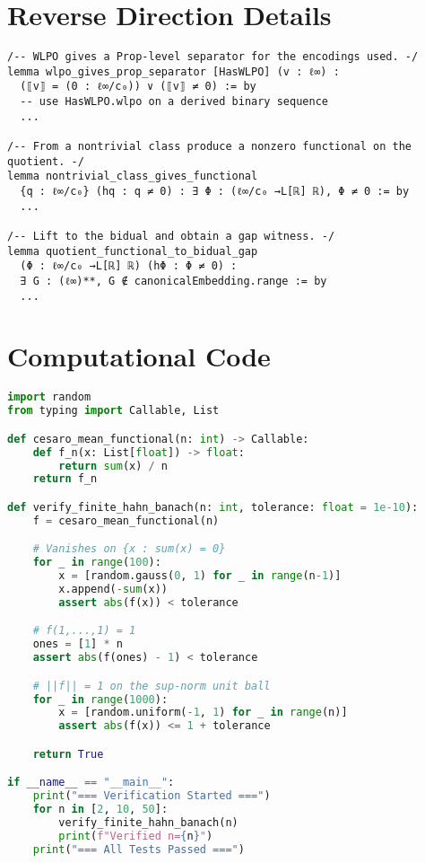 \documentclass{lmcs}
\begin{document}
\section{Reverse Direction Details}

\begin{lstlisting}[caption={Lemma structure for WLPO ⇒ Gap}]
/-- WLPO gives a Prop-level separator for the encodings used. -/
lemma wlpo_gives_prop_separator [HasWLPO] (v : ℓ∞) :
  (⟦v⟧ = (0 : ℓ∞/c₀)) ∨ (⟦v⟧ ≠ 0) := by
  -- use HasWLPO.wlpo on a derived binary sequence
  ...

/-- From a nontrivial class produce a nonzero functional on the quotient. -/
lemma nontrivial_class_gives_functional
  {q : ℓ∞/c₀} (hq : q ≠ 0) : ∃ Φ : (ℓ∞/c₀ →L[ℝ] ℝ), Φ ≠ 0 := by
  ...

/-- Lift to the bidual and obtain a gap witness. -/
lemma quotient_functional_to_bidual_gap
  (Φ : ℓ∞/c₀ →L[ℝ] ℝ) (hΦ : Φ ≠ 0) :
  ∃ G : (ℓ∞)**, G ∉ canonicalEmbedding.range := by
  ...
\end{lstlisting}

\section{Computational Code}\label{app:computational}

\begin{lstlisting}[language=Python, caption={Finite Hahn--Banach verification (Cesàro means)}]
import random
from typing import Callable, List

def cesaro_mean_functional(n: int) -> Callable:
    def f_n(x: List[float]) -> float:
        return sum(x) / n
    return f_n

def verify_finite_hahn_banach(n: int, tolerance: float = 1e-10):
    f = cesaro_mean_functional(n)

    # Vanishes on {x : sum(x) = 0}
    for _ in range(100):
        x = [random.gauss(0, 1) for _ in range(n-1)]
        x.append(-sum(x))
        assert abs(f(x)) < tolerance

    # f(1,...,1) = 1
    ones = [1] * n
    assert abs(f(ones) - 1) < tolerance

    # ||f|| = 1 on the sup-norm unit ball
    for _ in range(1000):
        x = [random.uniform(-1, 1) for _ in range(n)]
        assert abs(f(x)) <= 1 + tolerance

    return True

if __name__ == "__main__":
    print("=== Verification Started ===")
    for n in [2, 10, 50]:
        verify_finite_hahn_banach(n)
        print(f"Verified n={n}")
    print("=== All Tests Passed ===")
\end{lstlisting}
\end{document}
